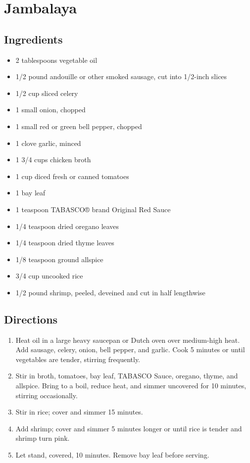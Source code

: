 \documentclass[oneside,11pt]{book}
\newcommand{\Ingredients}[1]{
    \subsection*{Ingredients}
    \begin{itemize} 
        #1 
    \end{itemize}
}
\newcommand{\Directions}[1]{
    \subsection*{Directions}
    \begin{enumerate} 
        #1 
    \end{enumerate}
}
\newcommand{\recipe}[3]{
    \pagebreak
    \section*{ \hspace{-12pt} #1 }
    \addcontentsline{toc}{section}{ \hspace{-6pt} #1 }
    
    \begin{minipage}[t]{0.35\textwidth}
        #2
    \end{minipage}
    \hspace{0.05\textwidth}
    \begin{minipage}[t]{0.6\textwidth}
        #3
    \end{minipage}
}
\begin{document}
    \recipe{Jambalaya}{
        \Ingredients{
            \item 2 tablespoons vegetable oil
            \item 1/2 pound andouille or other smoked sausage, cut into 1/2-inch slices
            \item 1/2 cup sliced celery
            \item 1 small onion, chopped
            \item 1 small red or green bell pepper, chopped
            \item 1 clove garlic, minced
            \item 1 3/4 cups chicken broth
            \item 1 cup diced fresh or canned tomatoes
            \item 1 bay leaf
            \item 1 teaspoon TABASCO® brand Original Red Sauce
            \item 1/4 teaspoon dried oregano leaves
            \item 1/4 teaspoon dried thyme leaves
            \item 1/8 teaspoon ground allspice
            \item 3/4 cup uncooked rice
            \item 1/2 pound shrimp, peeled, deveined and cut in half lengthwise
        }
    }{
        \Directions{
            \item Heat oil in a large heavy saucepan or Dutch oven over medium-high heat. 
                Add sausage, celery, onion, bell pepper, and garlic. 
                Cook 5 minutes or until vegetables are tender, stirring frequently.
            \item Stir in broth, tomatoes, bay leaf, TABASCO Sauce, oregano, thyme, and allspice. 
                Bring to a boil, reduce heat, and simmer uncovered for 10 minutes, stirring occasionally. 
            \item Stir in rice; cover and simmer 15 minutes. 
            \item Add shrimp; cover and simmer 5 minutes longer or until rice is tender and shrimp turn pink. 
            \item Let stand, covered, 10 minutes. 
                Remove bay leaf before serving.
        }
    }
\end{document}
